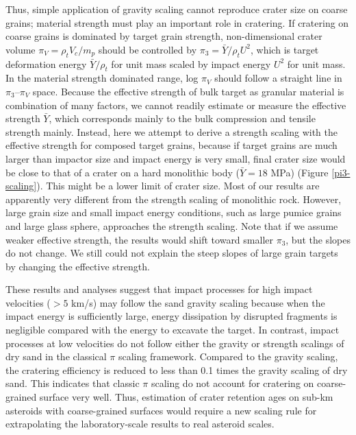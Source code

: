\documentclass[3p,authoryear]{elsarticle}
\begin{document}
Thus, simple application of gravity scaling cannot reproduce crater size on coarse grains; material strength must play an important role in cratering.
If cratering on coarse grains is dominated by target grain strength, non-dimensional crater volume $\pi_V=\rho_t V_c/m_p$ should be controlled by $\pi_3=\bar{Y}/ \rho_t U^2$, which is target deformation energy $\bar{Y}/\rho_t$ for unit mass scaled by impact energy $U^2$ for unit mass.
In the material strength dominated range, log $\pi_V$ should follow a straight line in $\pi_3$--$\pi_V$ space.
Because the effective strength of bulk target as granular material is combination of many factors, we cannot readily estimate or measure the effective strength $\bar{Y}$, which corresponds mainly to the bulk compression and tensile strength mainly.
Instead, here we attempt to derive a strength scaling with the effective strength for composed target grains, because if target grains are much larger than impactor size and impact energy is very small, final crater size would be close to that of a crater on a hard monolithic body ($\bar{Y}=18$ MPa) (Figure \ref{pi3-scaling}).
This might be a lower limit of crater size.
Most of our results are apparently very different from the strength scaling of monolithic rock. However, large grain size and small impact energy conditions, such as large pumice grains and large glass sphere, approaches the strength scaling.
Note that if we assume weaker effective strength, the results would shift toward smaller $\pi_3$, but the slopes do not change.
We still could not explain the steep slopes of large grain targets by changing the effective strength.

These results and analyses suggest that impact processes for high impact velocities ($> 5$ km/s) may follow the sand gravity scaling because when the impact energy is sufficiently large, energy dissipation by disrupted fragments is negligible compared with the energy to excavate the target.
In contrast, impact processes at low velocities do not follow either the gravity or strength scalings of dry sand in the classical $\pi$ scaling framework.
Compared to the gravity scaling, the cratering efficiency is reduced to less than 0.1 times the gravity scaling of dry sand.
This indicates that classic $\pi$ scaling do not account for cratering on coarse-grained surface very well. Thus, estimation of crater retention ages on sub-km asteroids with coarse-grained surfaces would require a new scaling rule for extrapolating the laboratory-scale results to real asteroid scales.
\end{document}
